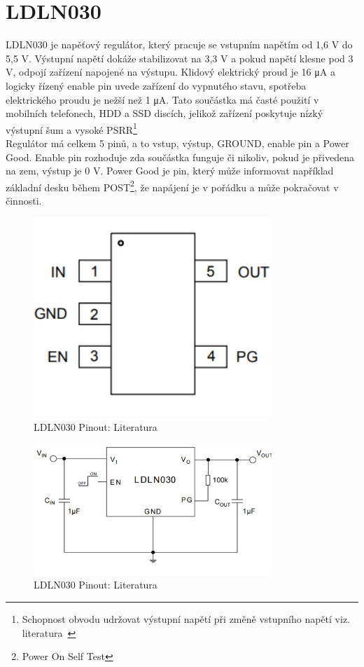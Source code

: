 \documentclass[a4paper, 12pt]{report}
\begin{document}
    \section{LDLN030}
    LDLN030 je napěťový regulátor, který pracuje se vstupním napětím od 1,6 V do 5,5 V. Výstupní napětí dokáže stabilizovat na 3,3 V a pokud napětí klesne pod 3 V, odpojí zařízení napojené na výstupu. Klidový elektrický proud je 16 \si{\micro A} a logicky řízený enable pin uvede zařízení do vypnutého stavu, spotřeba elektrického proudu je nežší než 1 \si{\micro A}. Tato součástka má časté použití v mobilních telefonech, HDD a SSD discích, jelikož zařízení poskytuje nízký výstupní šum a vysoké PSRR\footnote{Schopnost obvodu udržovat výstupní napětí při změně vstupního napětí viz. literatura~\cite{PSRR}} \\
    Regulátor má celkem 5 pinů, a to vstup, výstup, GROUND, enable pin a Power Good. Enable pin rozhoduje zda součástka funguje či nikoliv, pokud je přivedena na zem, výstup je 0 V. Power Good je pin, který může informovat například základní desku během POST\footnote{Power On Self Test}, že napájení je v pořádku a může pokračovat v činnosti.
    \begin{figure}[h]
        \centering
        \includegraphics[width=9cm]{images/ldln030_datasheet}
        \caption{LDLN030 Pinout: Literatura~\cite{stabilizator}}
        \label{fig:ldln030_datasheet}
    \end{figure}

    \begin{figure}[h]
        \centering
        \includegraphics[width=9cm]{images/ldln030_datasheet2}
        \caption{LDLN030 Pinout: Literatura~\cite{stabilizator}}
        \label{fig:ldln030_datasheet2}
    \end{figure}
\end{document}
